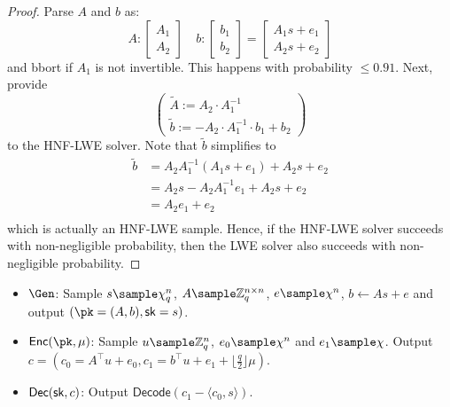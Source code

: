 \begin{lemma}
\end{lemma}
\begin{proof}
    Parse $A$ and $b$ as:
    \[A:\begin{bmatrix} A_1 \\ A_2 \end{bmatrix} \quad b:\begin{bmatrix} b_1 \\ b_2 \end{bmatrix} = \begin{bmatrix} A_1 s + e_1 \\ A_2 s + e_2 \end{bmatrix}\]
    and bbort if $A_1$ is not invertible. This happens with probability $\le 0.91$. Next, provide
    \[\begin{pmatrix} \tilde{A} := A_2 \cdot A_1^{-1} \\ \tilde{b} := -A_2 \cdot A_1^{-1} \cdot b_1 + b_2 \end{pmatrix}\] to the HNF-LWE solver. Note that $\tilde{b}$ simplifies to
    \begin{equation*}
        \begin{aligned}
            \tilde{b} & = A_2 A_1^{-1} (A_1 s + e_1) + A_2 s + e_2 \\
                      & = A_2 s - A_2 A_1^{-1} e_1 + A_2 s + e_2   \\
                      & = A_2 e_1 + e_2                            \\
        \end{aligned}
    \end{equation*}
    which is actually an HNF-LWE sample. Hence, if the HNF-LWE solver succeeds with non-negligible probability, then the LWE solver also succeeds with non-negligible probability.
\end{proof}

\begin{construction}
    \hfill
    \begin{itemize}
        \item $\Gen$: Sample $s \sample \chi_q^n$, $A \sample \mathbb{Z}_q^{n \times n}$, $e \sample \chi^n$, $b \gets As + e$ and output $(\pk = (A,b), \sk = s)$.
        \item $\Enc(\pk, \mu)$: Sample $u \sample \mathbb{Z}_q^n$, $e_0 \sample \chi^n$ and $e_1 \sample \chi$. Output $c = (c_0 = A^\intercal u + e_0,c_1 =  b^\intercal u + e_1 + \lfloor\frac{q}{2}\rfloor\mu)$.
        \item $\mathsf{Dec}(\mathsf{sk}, c)$: Output $\mathsf{Decode}(c_1 - \langle c_0, s\rangle)$.
    \end{itemize}
\end{construction}

